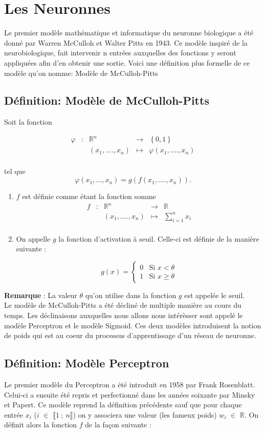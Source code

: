 \documentclass{article}
\newcommand{\fonction}[5]{
	\begin{array}{ccccc}
#1 & : & #2 & \to & #3\\
	& & #4 & \mapsto & #5\\ 
	\end{array}
}
\begin{document}
\section[Titre plus court]{Les Neuronnes}

Le premier modèle mathématique et informatique du neuronne biologique a été donné par Warren McCulloh et Walter Pitts en 1943.
Ce modèle inspiré de la neurobiologique, fait intervenir n entrées auxquelles des fonctions y seront appliquées afin d'en obtenir une sortie.
Voici une définition plus formelle de ce modèle qu'on nomme: Modèle de McCulloh-Pitts     

\subsection{Définition: Modèle de McCulloh-Pitts}
	Soit la fonction  

	\[\fonction{\varphi}{\mathbb{R}^n}{\left\{0,1\right\}}{(x_1,....,x_n)}{\varphi(x_1,....,x_n)} \]

	tel que  
	\[\varphi (x_1,...,x_n) = g(f(x_1,....,x_n)). \]  

	\begin{enumerate}
		\item $f$ est définie comme étant la fonction somme 
		\[\fonction{f}{\mathbb{R}^n}{\mathbb{R}}{(x_1,....,x_n)}{\sum_{i=1}^{n} {x_i}} \] 
		\item On appelle $g$ la fonction d'activation à seuil. Celle-ci est définie de la manière suivante :

		\[g(x) = \begin{cases} 0 &\mbox{Si } x < \theta \\
				 1 & \mbox{Si } x \geq \theta
	 		 \end{cases} 
		\]
	\end{enumerate}
	
	\textbf{Remarque} : La valeur $\theta$  qu'on utilise dans la fonction $g$ est appelée le seuil.\\
	

Le modèle de McCulloh-Pitts a été décliné de multiple manière au cours du temps. Les déclinaisons auxquelles nous allons nous intérèsser sont appelé le modèle Perceptron et le modèle Sigmoid. Ces deux modèles introduisent la notion de poids qui est au coeur du processus d'apprentissage d'un réseau de neuronne. 

	\subsection{Définition: Modèle Perceptron}
		Le premier modèle du Perceptron a été introduit en 1958 par Frank Rosenblatt. Celui-ci a ensuite été repris et perfectionné dans les années soixante par Minsky et Papert. Ce modèle reprend la définition précédente sauf que pour chaque entrée $x_i$ ($i$ $\in$ $\llbracket 1~;~n \rrbracket$) on y associera une valeur (les fameux poids) $w_i$ $\in$ $\mathbb{R}$. 
		On définit alors la fonction $f$ de la façon suivante : 
		
\end{document}
